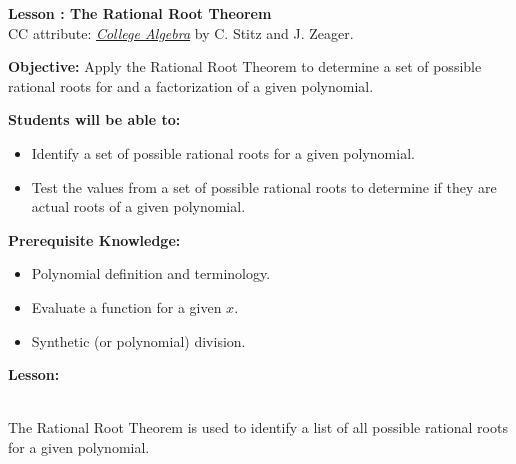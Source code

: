 \documentclass[12pt]{article}
\theoremstyle{definition}
\begin{document}
{\bf \large Lesson : The Rational Root Theorem}\label{les:rational_root_theorem}
\\ CC attribute: \href{http://www.stitz-zeager.com}{\it{College Algebra}} by C. Stitz and J. Zeager. 
\hfill \doclicenseImage[imagewidth=5em]\\
\par
{\bf Objective:} Apply the Rational Root Theorem to determine a set of possible rational roots for and a factorization of a given polynomial.\\
\par
{\bf Students will be able to:}
\begin{itemize}
	\item Identify a set of possible rational roots for a given polynomial.
	\item Test the values from a set of possible rational roots to determine if they are actual roots of a given polynomial.
\end{itemize}
{\bf Prerequisite Knowledge:}
\begin{itemize}
	\item Polynomial definition and terminology.
	\item Evaluate a function for a given $x$.
	\item Synthetic (or polynomial) division.
\end{itemize}
\hrulefill

{\bf Lesson:}\\
\ \par

The Rational Root Theorem is used to identify a list of all possible rational roots for a given polynomial.

\begin{center}
\end{center}
\end{document}
